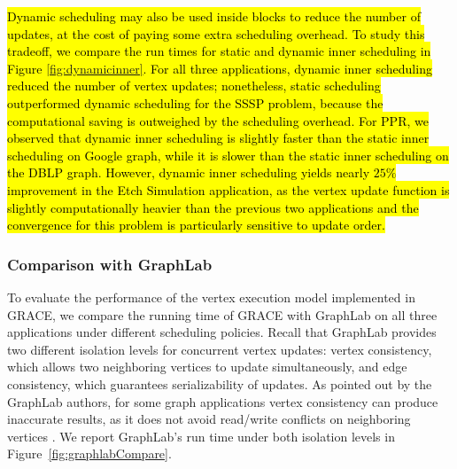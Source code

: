 \hl{
Dynamic scheduling may also be used inside blocks
to reduce the number of updates, at the cost of paying 
some extra scheduling overhead.
To study this tradeoff, 
we compare the run times for static and dynamic inner
scheduling in
Figure {\ref{fig:dynamicinner}}.
For all three applications, dynamic inner scheduling reduced the
number of vertex updates; nonetheless, static scheduling
outperformed dynamic scheduling for the SSSP problem,
because the computational saving is outweighed by the scheduling overhead. 
For PPR, we observed that dynamic inner scheduling is slightly faster than the static inner scheduling on Google graph, while it is slower than the static inner scheduling on the DBLP graph.
However, dynamic inner scheduling yields nearly $25\%$ improvement 
in the Etch Simulation application,
as the vertex update function is slightly 
computationally heavier than the previous two applications and the
convergence for this problem is particularly sensitive to update order.  }


\subsubsection{Comparison with GraphLab}

To evaluate the performance of the vertex execution model implemented
in GRACE, we compare the running time of GRACE with GraphLab on all
three applications under different scheduling policies.
Recall that GraphLab provides two different isolation levels for concurrent vertex updates: 
vertex consistency, which allows two neighboring vertices to update simultaneously, 
and edge consistency, which guarantees serializability of updates. 
As pointed out by the 
GraphLab authors,
for some graph applications vertex consistency 
can produce inaccurate results, as it does not avoid read/write conflicts on neighboring vertices
\cite{Low+10:GraphLab, Low+12:DistGraphLab}.
We report GraphLab's run time under both isolation levels in 
Figure~\ref{fig:graphlabCompare}.

